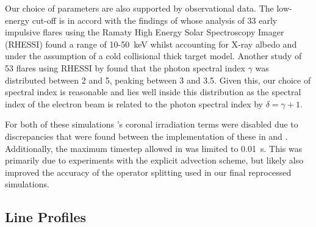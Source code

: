 Our choice of parameters are also supported by observational data.
The low-energy cut-off is in accord with the findings of \citet{Sui2007} whose analysis of 33 early impulsive flares using the Ramaty High Energy Solar Spectroscopy Imager (RHESSI) found a range of 10-\SI{50}{\kilo\electronvolt} whilst accounting for X-ray albedo and under the assumption of a cold collisional thick target model.
Another study of 53 flares using RHESSI by \citet{Saint-Hilaire2008} found that the photon spectral index $\gamma$ was distributed between 2 and 5, peaking between 3 and 3.5.
Given this, our choice of spectral index is reasonable and lies well inside this distribution as the spectral index of the electron beam is related to the photon spectral index by $\delta = \gamma + 1$.

For both of these simulations \Radyn{}'s coronal irradiation terms were disabled due to discrepancies that were found between the implementation of these in \Radyn{} and \Lw{}.
Additionally, the maximum timestep allowed in \Radyn{} was limited to \SI{0.01}{\second}.
This was primarily due to experiments with the explicit advection scheme, but likely also improved the accuracy of the operator splitting used in our final reprocessed simulations.

\subsection{Line Profiles}\label{Sec:TimeDep8542Profiles}

